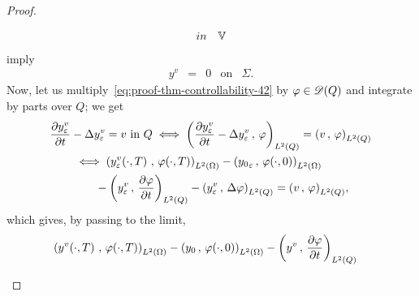 \begin{proof}
\begin{enumerate}
\begin{equation*}
\begin{array}{rclll}
{                    in} & \mathbb{V}
                \end{array}
            \end{equation*}
            imply
            \begin{equation}\label{eq:proof-thm-controllability-47}
                \begin{array}{rclll}
                    y^{v} & = & 0 & \text{on} & \Sigma.
                \end{array}
            \end{equation}
            Now, let us multiply~\eqref{eq:proof-thm-controllability-42} by
            $\varphi\in \mathscr{D}(Q)$ and integrate by parts over $Q$; we get
            \begin{equation*}
                \begin{split}
                    {} & \primetemps{y_{\veps}^{v}} - \Delta y_{\veps}^{v}
                    = v\ \text{in}\ Q \iff \scalaireq{%
                        \primetemps{y_{\veps}^{v}} - \Delta y_{\veps}^{v}
                    }{\vphi} = \scalaireq{v}{\vphi}\\
                    &\qquad\iff \scalaireohm{%
                        \condfinale{y_{\veps}^{v}}
                    }{%
                        \condfinale{\vphi}
                    } - \scalaireohm{%
                        {y_{0}}_{\veps}
                    }{%
                        \condinitiale{\vphi}
                    }\\
                    &\qquad\qquad - \scalaireq{%
                        y_{\veps}^{v}
                    }{%
                        \primetemps{\vphi}
                    } - \scalaireq{%
                        y_{\veps}^{v}
                    }{%
                        \Delta\vphi{}
                    } = \scalaireq{v}{\vphi},
                \end{split}
            \end{equation*}
            which gives, by passing to the limit,
            \begin{equation*}
                \begin{split}
                    {} & \scalaireohm{%
                        \condfinale{y^{v}}
                    }{%
                        \condfinale{\vphi}
                    } - \scalaireohm{%
                        y_{0}
                    }{%
                        \condinitiale{\vphi}
                    } - \scalaireq{%
                        y^{v}
                    }{%
                        \primetemps{\vphi}
}
\end{split}
\end{equation*}
\end{enumerate}
\end{proof}
